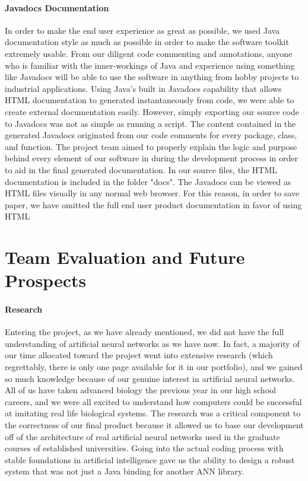 \documentclass[letterpaper, 10pt]{article}
\begin{document}
		\paragraph{Javadocs Documentation}
		In order to make the end user experience as great as possible, we used Java documentation style as much as possible in order to make the software toolkit extremely usable. From our diligent code commenting and annotations, anyone who is familiar with the inner-workings of Java and experience using something like Javadocs will be able to use the software in anything from hobby projects to industrial applications. Using Java's built in Javadocs capability that allows HTML documentation to generated instantaneously from code, we were able to create external documentation easily. However, simply exporting our source code to Javadocs was not as simple as running a script. The content contained in the generated Javadocs originated from our code comments for every package, class, and function. The project team aimed to properly explain the logic and purpose behind every element of our software in during the development process in order to aid in the final generated documentation. In our source files, the HTML documentation is included in the folder "docs". The Javadocs can be viewed as HTML files visually in any normal web browser. For this reason, in order to save paper, we have omitted the full end user product documentation in favor of using HTML
		
\cleardoublepage		
\section{Team Evaluation and Future Prospects}
	\paragraph{Research}
	Entering the project, as we have already mentioned, we did not have the full understanding of artificial neural networks as we have now. In fact, a majority of our time allocated toward the project went into extensive research (which regrettably, there is only one page available for it in our portfolio), and we gained so much knowledge because of our genuine interest in artificial neural networks. All of us have taken advanced biology the previous year in our high school careers, and we were all excited to understand how computers could be successful at imitating real life biological systems. The research was a critical component to the correctness of our final product because it allowed us to base our development off of the architecture of real artificial neural networks used in the graduate courses of established universities. Going into the actual coding process with stable foundations in artificial intelligence gave us the ability to design a robust system that was not just a Java binding for another ANN library.
\end{document}
